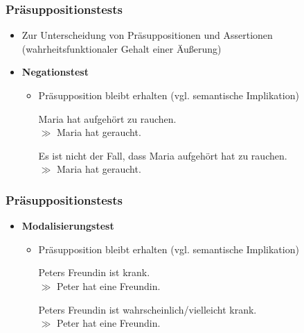 \begin{frame}
\frametitle{Präsuppositionstests}

\begin{itemize}
	\item Zur Unterscheidung von Präsuppositionen und Assertionen (wahrheitsfunktionaler Gehalt einer Äu\ss{}erung)
	\medskip
	\item \textbf{Negationstest}
	
	\begin{itemize}
		\item Präsupposition bleibt erhalten (vgl. semantische Implikation)		
		
		\ea Maria hat aufgehört zu rauchen.\\ $\gg$ Maria hat geraucht.
		\z
		
		\ea Es ist nicht der Fall, dass Maria aufgehört hat zu rauchen.\\ $\gg$ Maria hat geraucht.
		\z
		
	\end{itemize}	

\end{itemize}	



\end{frame}



\begin{frame}
\frametitle{Präsuppositionstests}

\begin{itemize}
	\item \textbf{Modalisierungstest}
	
	\begin{itemize}
		\item Präsupposition bleibt erhalten (vgl. semantische Implikation)

		\ea Peters Freundin ist krank.\\ $\gg$ Peter hat eine Freundin.
		\z
		
		\ea Peters Freundin ist wahrscheinlich/vielleicht krank.\\ $\gg$ Peter hat eine Freundin.
		\z
	
	\end{itemize}
	
\end{itemize}

\end{frame}



